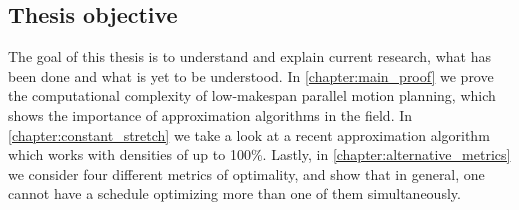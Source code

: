 \subsection{Thesis objective}


The goal of this thesis is to understand and explain current research, what has been done and what is yet to be understood. In \cref{chapter:main_proof} we prove the computational complexity of low-makespan parallel motion planning, which shows the importance of approximation algorithms in the field. In \cref{chapter:constant_stretch} we take a look at a recent approximation algorithm which works with densities of up to 100\%. Lastly, in \cref{chapter:alternative_metrics} we consider four different metrics of optimality, and show that in general, one cannot have a schedule optimizing more than one of them simultaneously. 
